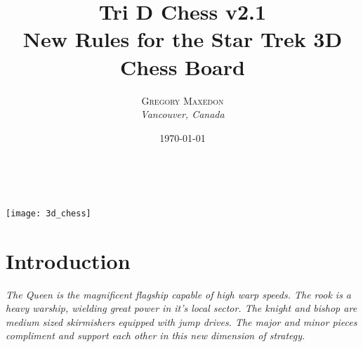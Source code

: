 \documentclass[12pt]{article} %
\title{\textbf{Tri D Chess v2.1} \\ %
New Rules for the Star Trek 3D Chess Board} %
\author{\textsc{Gregory Maxedon} %
\\{\textit{Vancouver, Canada}}} %
\date{\today} %
\makeatletter
\renewcommand{\maketitle}{ %
\begin{flushright} %

{\LARGE\@title} %

\vspace{50pt} %

{\large\@author} %
\\\@date %

\vspace{40pt} %
\end{flushright}

\begin{center}
\texttt{[image: 3d\_chess]}
\end{center}

}
\makeatother
\begin{document}
\maketitle %





\vspace{30pt} %


\section{Introduction}




\textit{The Queen is the magnificent flagship capable of high warp speeds. The rook is a heavy warship, wielding great power in it's local sector.  The knight and bishop are medium sized skirmishers equipped with jump drives.  The major and minor pieces compliment and support each other in this new dimension of strategy.}
\end{document}
